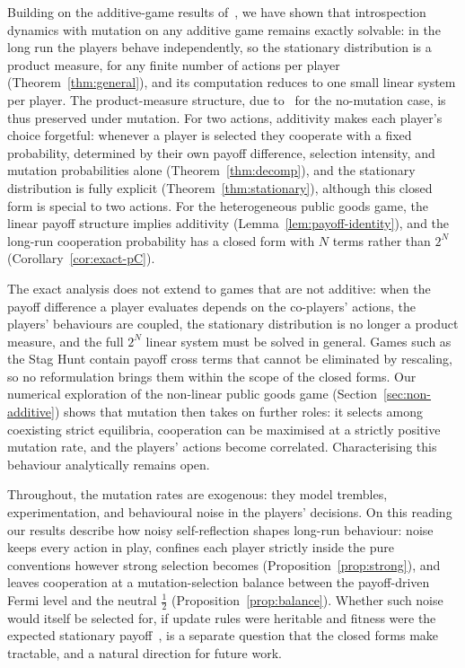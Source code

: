 \documentclass[11pt]{article}
\begin{document}
Building on the additive-game results of~\cite{couto2023multiplayer}, we have shown that
introspection dynamics with mutation on any additive game remains exactly
solvable: in the long run the players behave independently, so the
stationary distribution is a product measure, for any finite number of
actions per player (Theorem~\ref{thm:general}), and its computation reduces
to one small linear system per player. The product-measure structure, due
to~\cite{couto2023multiplayer} for the no-mutation case, is thus preserved
under mutation. For two actions, additivity makes each player's choice
forgetful: whenever a player is selected they cooperate with a fixed
probability, determined by their own payoff difference, selection intensity,
and mutation probabilities alone (Theorem~\ref{thm:decomp}), and the
stationary distribution is fully explicit (Theorem~\ref{thm:stationary}),
although this closed form is special to two actions. For the heterogeneous
public goods game, the linear payoff structure implies additivity
(Lemma~\ref{lem:payoff-identity}), and the long-run cooperation probability has a closed
form with \(N\) terms rather than \(2^N\) (Corollary~\ref{cor:exact-pC}).

The exact analysis does not extend to games that are not additive: when the
payoff difference a player evaluates depends on the co-players' actions, the
players' behaviours are coupled, the stationary distribution is no longer a
product measure, and the full \(2^N\) linear system must be solved in
general. Games such as the Stag Hunt contain payoff cross terms that cannot
be eliminated by rescaling, so no reformulation brings them within the scope
of the closed forms. Our numerical exploration of the non-linear public
goods game (Section~\ref{sec:non-additive}) shows that mutation then takes
on further roles: it selects among coexisting strict equilibria, cooperation
can be maximised at a strictly positive mutation rate, and the players'
actions become correlated. Characterising this behaviour analytically
remains open.

Throughout, the mutation rates are exogenous: they model trembles,
experimentation, and behavioural noise in the players' decisions. On this
reading our results describe how noisy self-reflection shapes long-run
behaviour: noise keeps every action in play, confines each player strictly
inside the pure conventions however strong selection becomes
(Proposition~\ref{prop:strong}), and leaves cooperation at a
mutation-selection balance between the payoff-driven Fermi level and the
neutral \(\tfrac{1}{2}\) (Proposition~\ref{prop:balance}). Whether such
noise would itself be selected for, if update rules were heritable and
fitness were the expected stationary
payoff~\cite{traulsen2009exploration}, is a separate question that the
closed forms make tractable, and a natural direction for future work.
\end{document}
